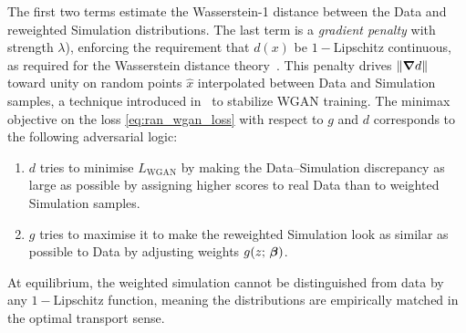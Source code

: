 {{            The first two terms estimate the Wasserstein-1 distance between the Data and reweighted Simulation distributions.
            The last term is a \emph{gradient penalty}\cite{xia_penalty_2023} with strength $\lambda$), enforcing the requirement that $d(x)$ be \(1-\)Lipschitz continuous, as required for the Wasserstein distance theory~\cite{OptimalDistance}.
            This penalty drives $\norm{\grad d}$ toward unity on random points $\hat{x}$ interpolated between Data and Simulation samples, a technique introduced in~\cite{gulrajani_improved_2017} to stabilize WGAN training.
            The minimax objective on the loss \cref{eq:ran_wgan_loss} with respect to $g$ and $d$ corresponds to the following adversarial logic:
            \begin{enumerate}
                \item $d$ tries to minimise $L_{\text{WGAN}}$ by making the Data--Simulation discrepancy as large as possible by assigning higher scores to real Data than to weighted Simulation samples.
                \item $g$ tries to maximise it to make the reweighted Simulation look as similar as possible to Data by adjusting weights $g(z;\,\vb*\beta)$.
            \end{enumerate}
            At equilibrium, the weighted simulation cannot be distinguished from data by any \(1-\)Lipschitz function, meaning the distributions are empirically matched in the optimal transport sense.
    
}}
